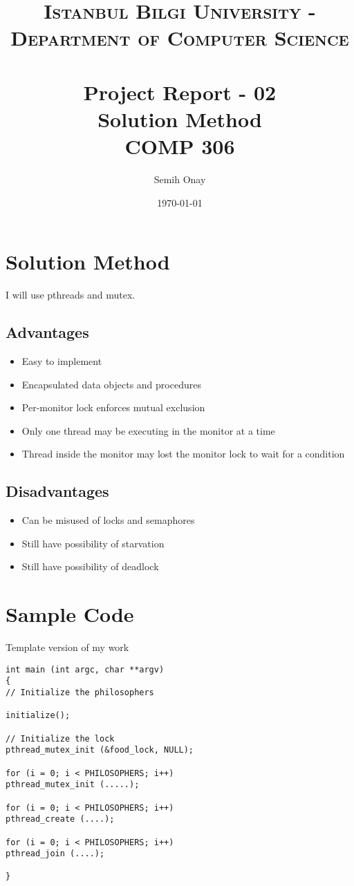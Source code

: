 \documentclass{article}
\title{	
\normalfont \normalsize 
\textsc{Istanbul Bilgi University - Department of Computer Science} \\ [25pt]
\horrule{0.5pt} \\[0.4cm]
\huge Project Report - 02 \\ Solution Method \\ COMP 306 
\horrule{2pt} \\[0.5cm]
}
\author{Semih Onay}
\date{\normalsize\today}
\numberwithin{figure}{section}
\begin{document}
\maketitle


\section{Solution Method}
I will use pthreads and mutex.


\subsection{Advantages}
\begin{itemize}
\item Easy to implement
\item Encapsulated data objects and procedures
\item Per-monitor lock enforces mutual exclusion
\item Only one thread may be executing in the monitor at a time
\item Thread inside the monitor may lost the monitor lock to wait for a condition
\end{itemize}

\subsection{Disadvantages}
\begin{itemize}
\item Can be misused of locks and semaphores
\item Still have possibility of starvation
\item Still have possibility of deadlock
\end{itemize} 

\section{Sample Code}

Template version of my work

\begin{lstlisting}
int main (int argc, char **argv)
{
// Initialize the philosophers

initialize();

// Initialize the lock
pthread_mutex_init (&food_lock, NULL);

for (i = 0; i < PHILOSOPHERS; i++)
pthread_mutex_init (.....);

for (i = 0; i < PHILOSOPHERS; i++)
pthread_create (....);

for (i = 0; i < PHILOSOPHERS; i++)
pthread_join (....);

}
\end{lstlisting}
\end{document}
